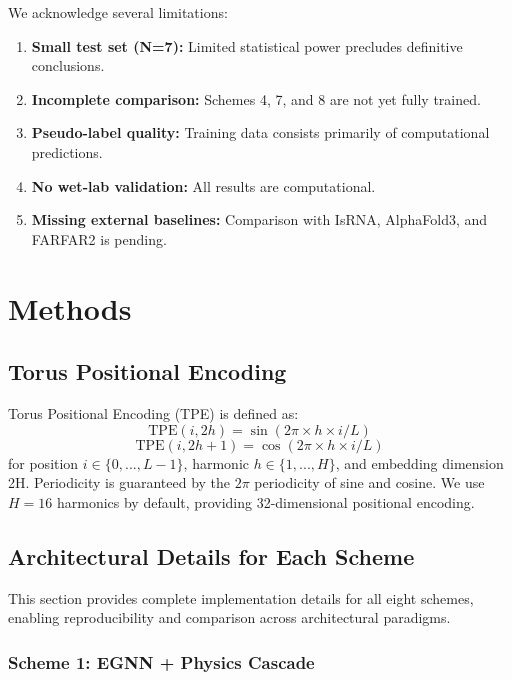 \documentclass[12pt]{article}
\begin{document}
We acknowledge several limitations:
\begin{enumerate}
\item \textbf{Small test set (N=7):} Limited statistical power precludes definitive conclusions.
\item \textbf{Incomplete comparison:} Schemes 4, 7, and 8 are not yet fully trained.
\item \textbf{Pseudo-label quality:} Training data consists primarily of computational predictions.
\item \textbf{No wet-lab validation:} All results are computational.
\item \textbf{Missing external baselines:} Comparison with IsRNA, AlphaFold3, and FARFAR2 is pending.
\end{enumerate}

\section{Methods}

\subsection{Torus Positional Encoding}

Torus Positional Encoding (TPE) is defined as:
\begin{equation}
\text{TPE}(i, 2h) = \sin(2\pi \times h \times i / L)
\end{equation}
\begin{equation}
\text{TPE}(i, 2h+1) = \cos(2\pi \times h \times i / L)
\end{equation}
for position $i \in \{0, ..., L-1\}$, harmonic $h \in \{1, ..., H\}$, and embedding dimension 2H. Periodicity is guaranteed by the $2\pi$ periodicity of sine and cosine. We use $H = 16$ harmonics by default, providing 32-dimensional positional encoding.

\subsection{Architectural Details for Each Scheme}

This section provides complete implementation details for all eight schemes, enabling reproducibility and comparison across architectural paradigms.

\subsubsection{Scheme 1: EGNN + Physics Cascade}
\end{document}
